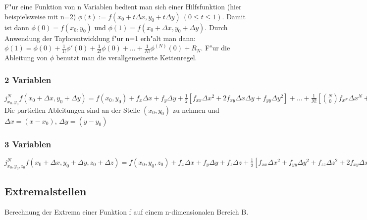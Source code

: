 \documentclass[10pt, a4paper, twocolumn]{scrartcl}
\begin{document}
F"ur eine Funktion von n Variablen bedient man sich einer Hilfsfunktion (hier beispielsweise mit n=2) $\phi(t):=f(x_0+t\Delta x,y_0+t\Delta y)\:(0\leq t\leq 1)$. Damit ist dann $\phi(0)=f(x_0,y_0)$ und $\phi(1)=f(x_0+\Delta x, y_0+\Delta y)$. Durch Anwendung der Taylorentwicklung f"ur n=1 erh"alt man dann: $\phi(1)=\phi(0)+\frac{1}{1!}\phi'(0)+\frac{1}{2!}\phi(0)+\ldots+\frac{1}{N!}\phi^{(N)}(0)+R_N$. F"ur die Ableitung von $\phi$ benutzt man die verallgemeinerte Kettenregel.

\subsubsection{2 Variablen}

\footnotesize
$j^N_{x_0,y_0}f(x_0+\Delta x,y_0+\Delta y)=f(x_0,y_0)+f_x\Delta x+f_y\Delta y+\frac{1}{2}[f_{xx}\Delta x^2+2f_{xy}\Delta x\Delta y+f_{yy}\Delta y^2]+\ldots+\frac{1}{N!}[\binom{N}{0}f_{x^N}\Delta x^N+\binom{N}{1}f_{x^{N-1}y}\Delta x^{N-1}\Delta y+\ldots]+R_N(x,y)$
\normalsize\\

Die partiellen Ableitungen sind an der Stelle $(x_0,y_0)$ zu nehmen und $\Delta x=(x-x_0)$, $\Delta y=(y-y_0)$

\subsubsection{3 Variablen}

\footnotesize
$j^N_{x_0,y_0,z_0}f(x_0+\Delta x,y_0+\Delta y,z_0+\Delta z)=f(x_0,y_0,z_0)+f_x\Delta x+f_y\Delta y+f_z\Delta z+\frac{1}{2}[f_{xx}\Delta x^2+f_{yy}\Delta y^2+f_{zz}\Delta z^2+2f_{xy}\Delta x\Delta y+2f_{xz}\Delta x\Delta z+2f_{yz}\Delta y \Delta z]+\ldots+R_N$
\normalsize\\

\subsection{Extremalstellen}

Berechnung der Extrema einer Funktion f auf einem n-dimensionalen Bereich B.
\end{document}
